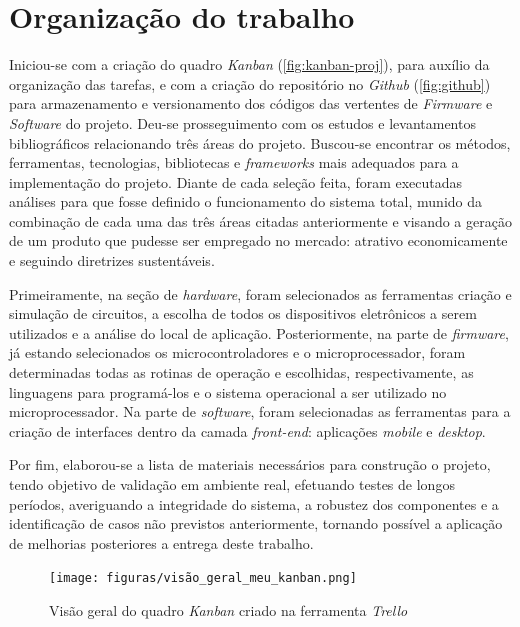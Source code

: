 \section{Organização do trabalho}

Iniciou-se com a criação do quadro \textit{Kanban} (\autoref{fig:kanban-proj}), para auxílio da organização das tarefas, e com a criação do repositório no \textit{Github} (\autoref{fig:github}) para armazenamento e versionamento dos códigos das vertentes de \textit{Firmware} e \textit{Software} do projeto. Deu-se prosseguimento com os estudos e levantamentos bibliográficos relacionando três áreas do projeto. Buscou-se encontrar os métodos,  ferramentas, tecnologias, bibliotecas e \textit{frameworks} mais adequados para a implementação do projeto.  Diante de cada seleção feita, foram executadas análises para que fosse definido o funcionamento do sistema total, munido da combinação de cada uma das três áreas citadas anteriormente e visando a geração de um produto que pudesse ser empregado no mercado: atrativo economicamente e seguindo diretrizes sustentáveis.  

Primeiramente, na seção de \textit{hardware}, foram selecionados as ferramentas criação e simulação de circuitos, a escolha de todos os dispositivos eletrônicos a serem utilizados e a análise do local de aplicação. Posteriormente, na parte de \textit{firmware}, já estando selecionados os microcontroladores e o microprocessador, foram determinadas todas as rotinas de operação e escolhidas, respectivamente, as linguagens para programá-los e o sistema operacional a ser utilizado no microprocessador. Na parte de \textit{software}, foram selecionadas as ferramentas para a criação de interfaces dentro da camada \textit{front-end}: aplicações \textit{mobile} e \textit{desktop}.

Por fim, elaborou-se a lista de materiais necessários para construção o projeto, tendo objetivo de validação em ambiente real, efetuando testes de longos períodos, averiguando a integridade do sistema, a robustez dos componentes e a identificação de casos não previstos anteriormente, tornando possível a aplicação de melhorias posteriores a entrega deste trabalho.

\begin{figure}[H]
	\centering
	\caption{Visão geral do quadro \textit{Kanban} criado na ferramenta \textit{Trello}}
	\texttt{[image: figuras/visão\_geral\_meu\_kanban.png]}
	\label{fig:kanban-proj}
\end{figure}


